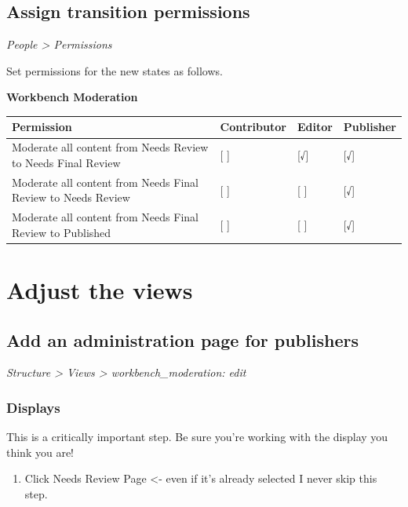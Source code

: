 \documentclass[letterpaper,10pt,english]{sphinxmanual}
\begin{document}
\section{Assign transition permissions}
\label{moderation:assign-transition-permissions}
\emph{People \textgreater{} Permissions}

Set permissions for the new states as follows.

\textbf{Workbench Moderation}

\begin{tabulary}{\linewidth}{|L|L|L|L|}
\hline
\textbf{
Permission
} & \textbf{
Contributor
} & \textbf{
Editor
} & \textbf{
Publisher
}\\\hline

Moderate all content from Needs Review to Needs Final Review
 & 
{[} {]}
 & 
{[}√{]}
 & 
{[}√{]}
\\\hline

Moderate all content from Needs Final Review to Needs Review
 & 
{[} {]}
 & 
{[} {]}
 & 
{[}√{]}
\\\hline

Moderate all content from Needs Final Review to Published
 & 
{[} {]}
 & 
{[} {]}
 & 
{[}√{]}
\\\hline
\end{tabulary}



\chapter{Adjust the views}
\label{moderation:adjust-the-views}\label{moderation:views}

\section{Add an administration page for publishers}
\label{moderation:add-an-administration-page-for-publishers}
\emph{Structure \textgreater{} Views \textgreater{} workbench\_moderation: edit}


\subsection{Displays}
\label{moderation:displays}
This is a critically important step. Be sure you're working with the display you think you are!
\begin{enumerate}
\item {} 
Click Needs Review Page \textless{}- even if it's already selected I never skip this step.

\end{enumerate}
\end{document}
